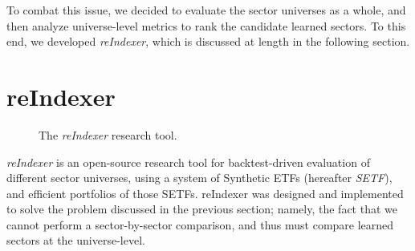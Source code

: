 \documentclass[../main.tex]{subfiles}
\begin{document}
To combat this issue, we decided to evaluate the sector universes as a whole, and then analyze universe-level metrics to rank the candidate learned sectors. To this end, we developed \textit{reIndexer}, which is discussed at length in the following section.

\section{reIndexer}

\begin{figure}
    \centering
    \vspace{\wrapfigadjustment}
    \caption{The \textit{reIndexer} research tool.}
    \label{fig:candidate_universe_ranking:reindexer_logo}
\end{figure}

\textit{reIndexer} is an open-source research tool for backtest-driven evaluation of different sector universes, using a system of Synthetic ETFs (hereafter \textit{SETF}), and efficient portfolios of those SETFs. reIndexer was designed and implemented to solve the problem discussed in the previous section; namely, the fact that we cannot perform a sector-by-sector comparison, and thus must compare learned sectors at the universe-level.
\end{document}

